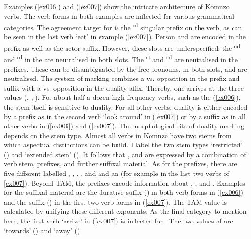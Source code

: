 Examples (\ref{ex006}) and (\ref{ex007}) show the intricate architecture of Komnzo verbs. The verb forms in both examples are inflected for various grammatical categories. The agreement target for  is the \Third\textsuperscript{rd}  singular prefix on the verb, as can be seen in the last verb `eat' in example (\ref{ex007}). Person and  are encoded in the  prefix as well as the actor suffix. However, these slots are underspecified: the \Second{}\textsuperscript{nd} and \Third\textsuperscript{rd}  in the  are neutralised in both slots. The \First\textsuperscript{st}  and \Second\textsuperscript{nd}  are neutralised in the prefixes. These can be disambiguated by the free pronouns. In both slots,  and  are neutralised. The system of  marking combines a  vs.  opposition in the prefix and suffix with a  vs.  opposition in the duality affix. Thereby, one arrives at the three  values (\Sg, \Du, \Pl). For about half a dozen high frequency verbs, such as the  (\ref{ex006}), the stem itself is sensitive to duality. For all other verbs, duality is either encoded by a prefix as in the second verb `look around' in (\ref{ex007}) or by a suffix as in all other verbs in (\ref{ex006}) and (\ref{ex007}). The morphological site of duality marking depends on the stem type. Almost all verbs in Komnzo have two stems from which aspectual distinctions can be build. I label the two stem types `restricted' (\Rs{}) and `extended stem' (\Ext). It follows that ,  and  are expressed by a combination of verb stem, prefixes, and further suffixal material. As for the prefixes, there are five different  labelled \Alph{}, \Bet{}, \Betaone{}, \Betatwo{}, and \Gam{} and an   (for example in the last two verbs of \ref{ex007}). Beyond TAM, the prefixes encode information about , , and . Examples for the suffixal material are the durative suffix (\Dur{}) in both verb forms in (\ref{ex006}) and the  suffix (\Pst{}) in the first two verb forms in (\ref{ex007}). The TAM value is calculated by unifying these different exponents. As the final category to mention here, the first verb `arrive' in (\ref{ex007}) is inflected for . The two values of  are  `towards' (\Venit) and  `away' (\Andat).\\

